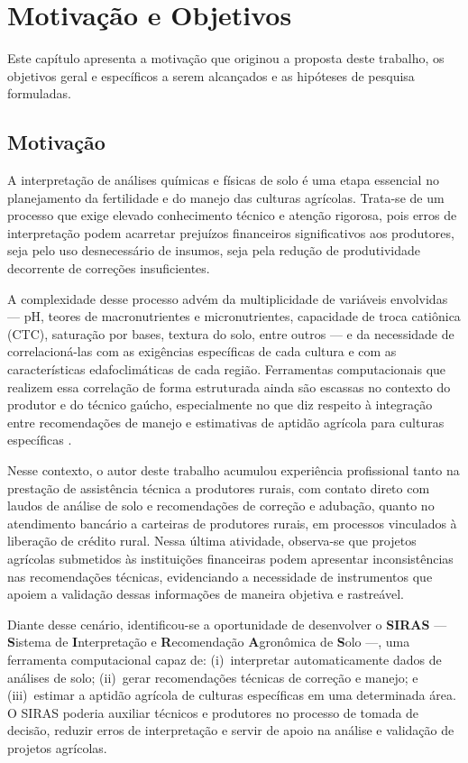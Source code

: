 \chapter{Motivação e Objetivos}\label{chap:problema}

Este capítulo apresenta a motivação que originou a proposta deste trabalho,
os objetivos geral e específicos a serem alcançados e as hipóteses de pesquisa formuladas.

\section{Motivação}

A interpretação de análises químicas e físicas de solo é uma etapa essencial
no planejamento da fertilidade e do manejo das culturas agrícolas. Trata-se de
um processo que exige elevado conhecimento técnico e atenção rigorosa, pois erros
de interpretação podem acarretar prejuízos financeiros significativos aos produtores,
seja pelo uso desnecessário de insumos, seja pela redução de produtividade decorrente
de correções insuficientes.

A complexidade desse processo advém da multiplicidade de variáveis envolvidas
--- pH, teores de macronutrientes e micronutrientes, capacidade de troca catiônica
(CTC), saturação por bases, textura do solo, entre outros \citep{Embrapa2011,
ManualCalagem2016} --- e da necessidade de correlacioná-las com as exigências
específicas de cada cultura e com as características edafoclimáticas de cada região.
Ferramentas computacionais que realizem essa correlação de forma estruturada ainda
são escassas no contexto do produtor e do técnico gaúcho, especialmente no que
diz respeito à integração entre recomendações de manejo e estimativas de aptidão
agrícola para culturas específicas \citep{Hofig2015, EmbrapaAptidao2025}.

Nesse contexto, o autor deste trabalho acumulou experiência profissional tanto
na prestação de assistência técnica a produtores rurais, com contato direto com
laudos de análise de solo e recomendações de correção e adubação, quanto no
atendimento bancário a carteiras de produtores rurais, em processos vinculados
à liberação de crédito rural. Nessa última atividade, observa-se que projetos
agrícolas submetidos às instituições financeiras podem apresentar inconsistências
nas recomendações técnicas, evidenciando a necessidade de instrumentos que apoiem
a validação dessas informações de maneira objetiva e rastreável.

Diante desse cenário, identificou-se a oportunidade de desenvolver o
\textbf{SIRAS} --- \textbf{S}istema de \textbf{I}nterpretação e \textbf{R}ecomendação
\textbf{A}gronômica de \textbf{S}olo ---, uma ferramenta computacional capaz de:
(i)~interpretar automaticamente dados de análises de solo; (ii)~gerar recomendações
técnicas de correção e manejo; e (iii)~estimar a aptidão agrícola de culturas
específicas em uma determinada área. O SIRAS poderia auxiliar técnicos e produtores
no processo de tomada de decisão, reduzir erros de interpretação e servir de apoio
na análise e validação de projetos agrícolas.

